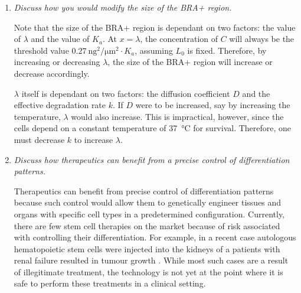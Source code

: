 \documentclass{article} %
\begin{document}
\begin{enumerate}
  
\item \textit{Discuss how you would modify the size of the BRA+ region.}

  Note that the size of the BRA+ region is dependant  on two factors: the value of $\lambda$ and the value of $K_a$. At $x=\lambda$, the concentration of $C$ will always be the threshold value $\SI{0.27}{\nano\g^2\per\micro\m^2}\cdot K_a$, assuming $L_0$ is fixed. Therefore, by increasing or decreasing $\lambda$, the size of the BRA+ region will increase or decrease accordingly.

  $\lambda$ itself is dependant on two factors: the diffusion coefficient $D$ and the effective degradation rate $k$. If $D$ were to be increased, say by increasing the temperature, $\lambda$ would also increase. This is impractical, however, since the cells depend on a constant temperature of \SI{37}{\celsius} for survival. Therefore, one must decrease $k$ to increase $\lambda$.
  
\item \textit{Discuss how therapeutics can benefit from a precise control of differentiation patterns.}

  Therapeutics can benefit from precise control of differentiation patterns because such control would allow them to genetically engineer tissues and organs with specific cell types in a predetermined configuration. Currently, there are few stem cell therapies on the market because of risk associated with controlling their differentiation. For example, in a recent case autologous hematopoietic stem cells were injected into the kidneys of a patients with renal failure resulted in tumour growth \parencite{marks2017clarifying}. While most such cases are a result of illegitimate treatment, the technology is not yet at the point where it is safe to perform these treatments in a clinical setting.
\end{enumerate}

\end{document}
